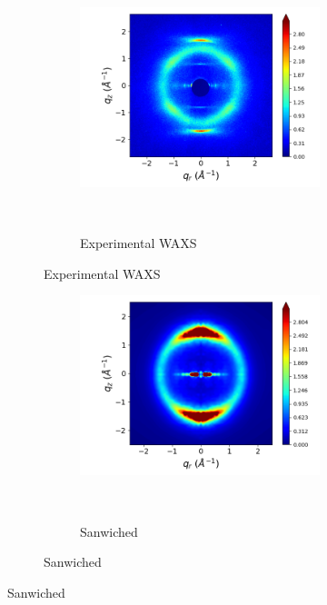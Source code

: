 \documentclass{article}
\begin{document}
  \begin{figure}[htb]
	\centering
	\begin{subfigure}{0.4\linewidth}
	\centering
			\begin{subfigure}{\textwidth}
		       		\centering
	        		\includegraphics[width=\linewidth]{WAXS_raw_jet.png}
	        		\caption{Experimental WAXS}~\label{fig:offset_tails}
			\end{subfigure}
	\end{subfigure}
	\begin{subfigure}{0.28\linewidth}
			\begin{subfigure}{\textwidth}
			\centering
		        	\includegraphics[width=\linewidth]{rzplot_layered_300K_jet.png}
			        \caption{Sanwiched}~\label{fig:rzplot_layered_300K}
			\end{subfigure}
			

\end{subfigure}
\end{figure}
\end{document}
